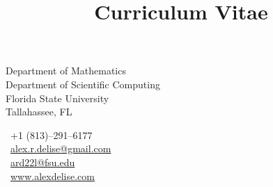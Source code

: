 \documentclass[11pt,letterpaper]{moderncv}
\title{Curriculum Vitae}
\begin{document}
\maketitle

\vspace{-2ex}
\begin{minipage}[t]{0.62\textwidth}
  \small
  \vspace{0.25em}
  Department of Mathematics \\
  Department of Scientific Computing \\
  Florida State University \\
  Tallahassee, FL
\end{minipage}%
\hfill
\begin{minipage}[t]{0.36\textwidth}
  \small
  \vspace{0.25em}
  \phonesymbol~+1 (813)--291--6177\\
  \emailsymbol~\href{mailto:alex.r.delise@gmail.com}{alex.r.delise@gmail.com}\\
  \emailsymbol~\href{mailto:ard22l@fsu.edu}{ard22l@fsu.edu}\\
  \Mundus~\href{http://www.alexdelise.com}{www.alexdelise.com}
\end{minipage}

\vspace{2ex}







\end{document}
